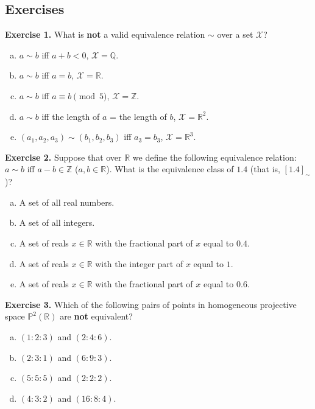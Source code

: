 \documentclass[../lecture-notes.tex]{subfiles}
\begin{document}
\subsection{Exercises}

\textbf{Exercise 1.} What is \textbf{not} a valid equivalence relation $\sim$ over a set $\mathcal{X}$?
\begin{enumerate}[a)]
    \item $a \sim b$ iff $a+b < 0$, $\mathcal{X} = \mathbb{Q}$.
    \item $a\sim b$ iff $a=b$, $\mathcal{X} = \mathbb{R}$.
    \item $a\sim b$ iff $a \equiv b \pmod{5}$, $\mathcal{X} = \mathbb{Z}$.
    \item $a\sim b$ iff the length of $a$ = the length of $b$, $\mathcal{X} = \mathbb{R}^2$.
    \item $(a_1,a_2,a_3)\sim (b_1,b_2,b_3)$ iff $a_3=b_3$, $\mathcal{X} = \mathbb{R}^3$.
\end{enumerate}

\textbf{Exercise 2.} Suppose that over $\mathbb{R}$ we define the following equivalence relation: $a \sim b$ iff $a-b \in \mathbb{Z}$ ($a,b \in \mathbb{R}$). What is the equivalence class of $1.4$ (that is, $[1.4]_{\sim}$)?
\begin{enumerate}[a)]
    \item A set of all real numbers.
    \item A set of all integers.
    \item A set of reals $x \in \mathbb{R}$ with the fractional part of $x$ equal to $0.4$.
    \item A set of reals $x \in \mathbb{R}$ with the integer part of $x$ equal to $1$.
    \item A set of reals $x \in \mathbb{R}$ with the fractional part of $x$ equal to $0.6$.
\end{enumerate}

\textbf{Exercise 3.} Which of the following pairs of points in homogeneous projective space $\mathbb{P}^2(\mathbb{R})$ are \textbf{not} equivalent?
\begin{enumerate}[a)]
    \item $(1:2:3)$ and $(2:4:6)$.
    \item $(2:3:1)$ and $(6:9:3)$.
    \item $(5:5:5)$ and $(2:2:2)$.
    \item $(4:3:2)$ and $(16:8:4)$.
\end{enumerate}
\end{document}
